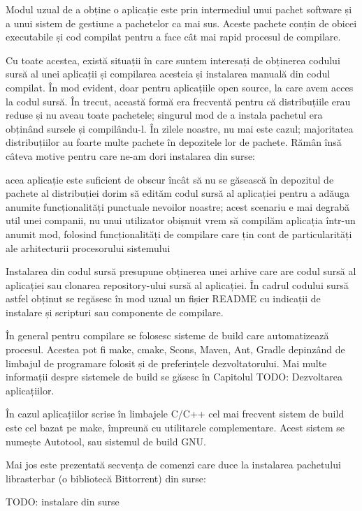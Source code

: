 Modul uzual de a obține o aplicație este prin intermediul unui pachet software și a unui sistem de gestiune a pachetelor ca mai sus. Aceste pachete conțin de obicei executabile și cod compilat pentru a face cât mai rapid procesul de compilare.

Cu toate acestea, există situații în care suntem interesați de obținerea codului sursă al unei aplicații și compilarea acesteia și instalarea manuală din codul compilat. În mod evident, doar pentru aplicațiile open source, la care avem acces la codul sursă. În trecut, această formă era frecventă pentru că distribuțiile erau reduse și nu aveau toate pachetele; singurul mod de a instala pachetul era obținând sursele și compilându-l. În zilele noastre, nu mai este cazul; majoritatea distribuțiilor au foarte multe pachete în depozitele lor de pachete. Rămân însă câteva motive pentru care ne-am dori instalarea din surse:

acea aplicație este suficient de obscur încât să nu se găsească în depozitul de pachete al distribuției
dorim să edităm codul sursă al aplicației pentru a adăuga anumite funcționalități punctuale nevoilor noastre; acest scenariu e mai degrabă util unei companii, nu unui utilizator obișnuit
vrem să compilăm aplicația într-un anumit mod, folosind funcționalități de compilare care țin cont de particularități ale arhitecturii procesorului sistemului

Instalarea din codul sursă presupune obținerea unei arhive care are codul sursă al aplicației sau clonarea repository-ului sursă al aplicației. În cadrul codului sursă astfel obținut se regăsesc în mod uzual un fișier README cu indicații de instalare și scripturi sau componente de compilare.

În general pentru compilare se folosesc sisteme de build care automatizează procesul. Acestea pot fi make, cmake, Scons, Maven, Ant, Gradle depinzând de limbajul de programare folosit și de preferințele dezvoltatorului. Mai multe informații despre sistemele de build se găsesc în Capitolul TODO: Dezvoltarea aplicațiilor.

În cazul aplicațiilor scrise în limbajele C/C++ cel mai frecvent sistem de build este cel bazat pe make, împreună cu utilitarele complementare. Acest sistem se numește Autotool, sau sistemul de build GNU.

Mai jos este prezentată secvența de comenzi care duce la instalarea pachetului librasterbar (o bibliotecă Bittorrent) din surse:

TODO: instalare din surse

